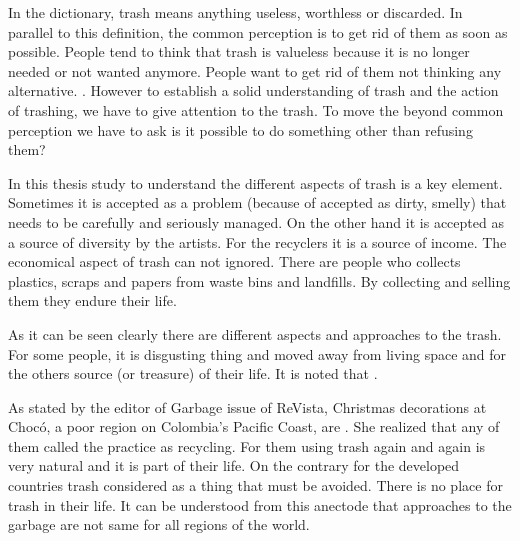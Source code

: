 




%
%
In the dictionary, 
trash means anything useless, worthless or discarded. In parallel to this definition, the common perception is to get rid of them as soon as possible. People tend to think that trash is valueless because it is no longer needed or not wanted anymore. People want to get rid of them not thinking any alternative.  \citep{navarro2015followingtrash}. However to establish a solid understanding of trash and the action of trashing, we have to give attention to the trash. To move the beyond common perception we have to ask is it possible to do something other than refusing them? %





%
%
In this thesis study to understand the different aspects of trash is a key element. Sometimes it is accepted as a problem (because of accepted as dirty, smelly) that needs to be carefully and seriously managed. On the other hand it is accepted as a source of diversity by the artists. For the recyclers it is a source of income. The economical aspect of trash can not ignored. There are people who collects plastics, scraps and papers from waste bins and landfills. By collecting and selling them they endure their life. 

As it can be seen clearly there are different aspects and approaches to the trash. For some people, it is disgusting thing and moved away from living space and for the others source (or treasure) of their life. It is noted that  \citep{zimring2012encyclopedia}.

As stated by the editor of Garbage issue of ReVista, Christmas decorations at Chocó, a poor region on Colombia’s Pacific Coast, are  \citep{erlick2015editorsletter}. She realized that any of them called the practice as recycling. For them using trash again and again is very natural and it is part of their life. On the contrary for the developed countries trash considered as a thing that must be avoided. There is no place for trash in their life. It can be understood from this anectode that approaches to the garbage are not same for all regions of the world.







